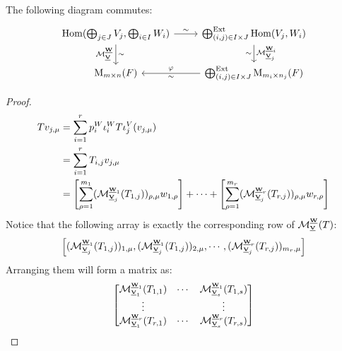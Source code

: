 \begin{theorem}
    The following diagram commutes:
    \[
        \begin{tikzcd}
            \Hom(\bigoplus_{j \in J}V_j, \bigoplus_{i \in I}W_i) \arrow[r, "\sim"]  \arrow[d, "\calM^{\bss{W}{}}_{\bss{V}{}}"', "\sim"]
            & \bigoplus^{\Ext}_{(i, j) \in I \times J} \Hom(V_j, W_i) \arrow[d, "\calM^{\bss{W}{i}}_{\bss{V}{j}}", "\sim"']
            \\
            \Mat_{m \times n}(F)
            & \bigoplus^{\Ext}_{(i, j) \in I \times J} \Mat_{m_i \times n_j}(F)  \arrow[l, "\varphi"', "\sim"]
        \end{tikzcd}
    \]
\end{theorem}
\begin{proof}
    \begin{equation*}
        \begin{aligned}
            T v_{j, \mu} &= \sum_{i=1}^r p_i^W \iota_i^W T \iota_j^V (v_{j, \mu}) \\
            &= \sum_{i=1}^r T_{i,j} v_{j, \mu} \\
            &= \left[ \sum_{\rho=1}^{m_1} (\calM^{\bss{W}{1}}_{\bss{V}{j}}(T_{1,j}))_{\rho, \mu} w_{1, \rho} \right] + \cdots + \left[ \sum_{\rho=1}^{m_r} (\calM^{\bss{W}{r}}_{\bss{V}{j}}(T_{r,j}))_{\rho, \mu} w_{r, \rho} \right] \\
        \end{aligned}
    \end{equation*}
    Notice that the following array is exactly the corresponding row of $\calM^{\bss{W}{}}_{\bss{V}{}}(T)$:
    \begin{equation*}
        \begin{bmatrix}
            (\calM^{\bss{W}{1}}_{\bss{V}{j}}(T_{1,j}))_{1, \mu}, (\calM^{\bss{W}{1}}_{\bss{V}{j}}(T_{1,j}))_{2, \mu}, \cdots, (\calM^{\bss{W}{r}}_{\bss{V}{j}}(T_{r,j}))_{m_r, \mu}
        \end{bmatrix}
    \end{equation*}
    Arranging them will form a matrix as:
    \begin{equation*}
        \begin{bmatrix}
            \calM^{\bss{W}{1}}_{\bss{V}{1}}(T_{1,1}) & \cdots & \calM^{\bss{W}{1}}_{\bss{V}{s}}(T_{1,s}) \\
            \vdots & & \vdots \\
            \calM^{\bss{W}{r}}_{\bss{V}{1}}(T_{r,1}) & \cdots & \calM^{\bss{W}{r}}_{\bss{V}{s}}(T_{r,s})
        \end{bmatrix}
    \end{equation*}
\end{proof}


